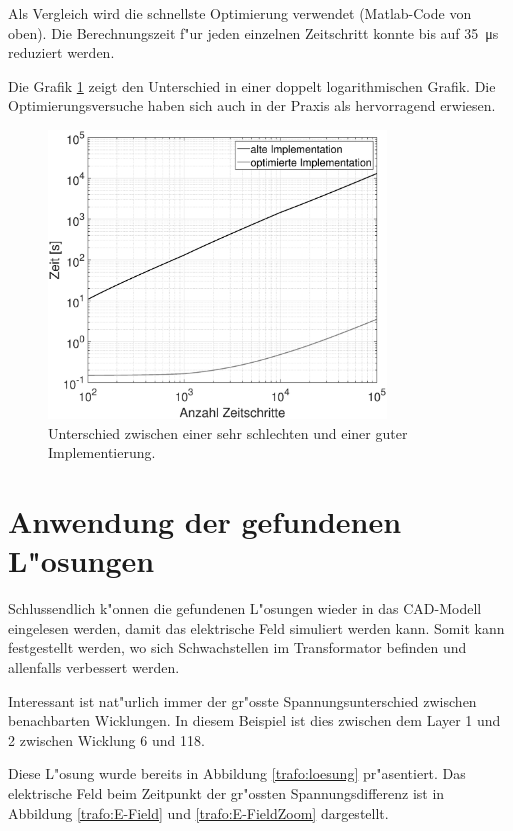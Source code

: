 \begin{refsection}
Als Vergleich wird die schnellste Optimierung verwendet (Matlab-Code von oben). Die Berechnungszeit f"ur jeden einzelnen Zeitschritt konnte bis auf \SI{35}{\micro \second} reduziert werden. 

Die Grafik \ref{trafo:Optimierung} zeigt den Unterschied in einer doppelt logarithmischen Grafik. Die Optimierungsversuche haben sich auch in der Praxis als hervorragend erwiesen.

\begin{figure}
	\centering
	\includegraphics[width=0.8\textwidth]{./trafo/images/differenceOptimization.eps}
	\caption{Unterschied zwischen einer sehr schlechten und einer guter Implementierung.}
	\label{trafo:Optimierung}
\end{figure}

\section{Anwendung der gefundenen L"osungen}

Schlussendlich k"onnen die gefundenen L"osungen wieder in das CAD-Modell eingelesen werden, damit das elektrische Feld simuliert werden kann. Somit kann festgestellt werden, wo sich Schwachstellen im Transformator befinden und allenfalls verbessert werden.

Interessant ist nat"urlich immer der gr"osste Spannungsunterschied zwischen benachbarten Wicklungen. In diesem Beispiel ist dies zwischen dem Layer 1 und 2 zwischen Wicklung 6 und 118.

Diese L"osung wurde bereits in Abbildung \ref{trafo:loesung} pr"asentiert. Das elektrische Feld beim Zeitpunkt der gr"ossten Spannungsdifferenz ist in Abbildung \ref{trafo:E-Field} und \ref{trafo:E-FieldZoom} dargestellt. 


\end{refsection}
